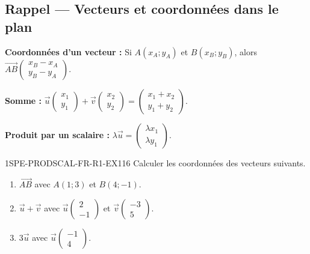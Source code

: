 

\subsection*{Rappel — Vecteurs et coordonnées dans le plan}

\textbf{Coordonnées d'un vecteur :} Si $A(x_A; y_A)$ et $B(x_B; y_B)$, alors $\overrightarrow{AB}\begin{pmatrix} x_B - x_A \\ y_B - y_A \end{pmatrix}$.

\textbf{Somme :} $\vec{u}\begin{pmatrix} x_1 \\ y_1 \end{pmatrix} + \vec{v}\begin{pmatrix} x_2 \\ y_2 \end{pmatrix} = \begin{pmatrix} x_1 + x_2 \\ y_1 + y_2 \end{pmatrix}$.

\textbf{Produit par un scalaire :} $\lambda \vec{u} = \begin{pmatrix} \lambda x_1 \\ \lambda y_1 \end{pmatrix}$.

\begin{exercice}{1SPE-PRODSCAL-FR-R1-EX1}{1}{6}
Calculer les coordonnées des vecteurs suivants.
\begin{enumerate}
  \item $\overrightarrow{AB}$ avec $A(1; 3)$ et $B(4; -1)$.
  \item $\vec{u} + \vec{v}$ avec $\vec{u}\begin{pmatrix} 2 \\ -1 \end{pmatrix}$ et $\vec{v}\begin{pmatrix} -3 \\ 5 \end{pmatrix}$.
  \item $3\vec{u}$ avec $\vec{u}\begin{pmatrix} -1 \\ 4 \end{pmatrix}$.
\end{enumerate}
\end{exercice}

